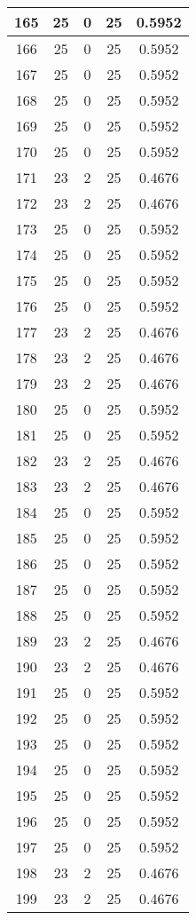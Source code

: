 \documentclass[letterpaper, 12pt]{article}
\begin{document}
\begin{longtable}{|c|c|c|c|c|}
\hline
165 & 25 & 0 & 25 & 0.5952 \\
\hline
166 & 25 & 0 & 25 & 0.5952 \\
\hline
167 & 25 & 0 & 25 & 0.5952 \\
\hline
168 & 25 & 0 & 25 & 0.5952 \\
\hline
169 & 25 & 0 & 25 & 0.5952 \\
\hline
170 & 25 & 0 & 25 & 0.5952 \\
\hline
171 & 23 & 2 & 25 & 0.4676 \\
\hline
172 & 23 & 2 & 25 & 0.4676 \\
\hline
173 & 25 & 0 & 25 & 0.5952 \\
\hline
174 & 25 & 0 & 25 & 0.5952 \\
\hline
175 & 25 & 0 & 25 & 0.5952 \\
\hline
176 & 25 & 0 & 25 & 0.5952 \\
\hline
177 & 23 & 2 & 25 & 0.4676 \\
\hline
178 & 23 & 2 & 25 & 0.4676 \\
\hline
179 & 23 & 2 & 25 & 0.4676 \\
\hline
180 & 25 & 0 & 25 & 0.5952 \\
\hline
181 & 25 & 0 & 25 & 0.5952 \\
\hline
182 & 23 & 2 & 25 & 0.4676 \\
\hline
183 & 23 & 2 & 25 & 0.4676 \\
\hline
184 & 25 & 0 & 25 & 0.5952 \\
\hline
185 & 25 & 0 & 25 & 0.5952 \\
\hline
186 & 25 & 0 & 25 & 0.5952 \\
\hline
187 & 25 & 0 & 25 & 0.5952 \\
\hline
188 & 25 & 0 & 25 & 0.5952 \\
\hline
189 & 23 & 2 & 25 & 0.4676 \\
\hline
190 & 23 & 2 & 25 & 0.4676 \\
\hline
191 & 25 & 0 & 25 & 0.5952 \\
\hline
192 & 25 & 0 & 25 & 0.5952 \\
\hline
193 & 25 & 0 & 25 & 0.5952 \\
\hline
194 & 25 & 0 & 25 & 0.5952 \\
\hline
195 & 25 & 0 & 25 & 0.5952 \\
\hline
196 & 25 & 0 & 25 & 0.5952 \\
\hline
197 & 25 & 0 & 25 & 0.5952 \\
\hline
198 & 23 & 2 & 25 & 0.4676 \\
\hline
199 & 23 & 2 & 25 & 0.4676 \\
\hline
\end{longtable}
\end{document}
